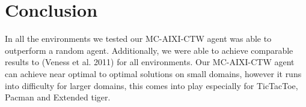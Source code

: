 \documentclass{article}
\theoremstyle{definition}
\newtheorem{primary statistics}[definition]{Primary Statistics}
\newtheorem{auxiliary statistics}[definition]{Auxiliary Statistics}
\begin{document}
\section{Conclusion}
In all the environments we tested our MC-AIXI-CTW agent was able to outperform a random agent. Additionally, we were able to achieve comparable results to (Veness et al. 2011) for all environments. Our MC-AIXI-CTW agent can achieve near optimal to optimal solutions on small domains, however it runs into difficulty for larger domains, this comes into play especially for TicTacToe, Pacman and Extended tiger.

  

\printbibliography
\end{document}
